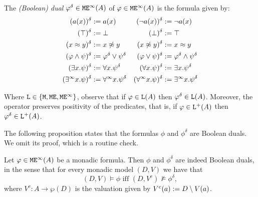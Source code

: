 \begin{definition}\label{def:concreteduals} 
The \emph{(Boolean) dual} $\varphi^{\delta} \in {\mathtt{M}\mathtt{E}^{\infty}}(A)$ of $\varphi\in 
{\mathtt{M}\mathtt{E}^{\infty}}(A)$ is the formula given by:
\begin{align*}
 (a(x))^{\delta} & \mathrel{:=}  a(x) 
 & (\lnot a(x))^{\delta} & \mathrel{:=}  \lnot a(x) 
\\ (\top)^{\delta} & \mathrel{:=}  \bot 
  & (\bot)^{\delta} & \mathrel{:=}  \top 
\\  (x \approx y)^{\delta} & \mathrel{:=}  x \not\approx y 
  & (x \not\approx y)^{\delta}& \mathrel{:=}  x \approx y 
\\ (\varphi \wedge \psi)^{\delta} &\mathrel{:=}  \varphi^{\delta} \vee \psi^{\delta} 
  &(\varphi \vee \psi)^{\delta}& \mathrel{:=}  \varphi^{\delta} \wedge \psi^{\delta}
\\ (\exists x.\psi)^{\delta} &\mathrel{:=}  \forall x.\psi^{\delta} 
  &(\forall x.\psi)^{\delta} &\mathrel{:=}  \exists x.\psi^{\delta} 
\\ (\exists^{\infty} x.\psi)^{\delta} &\mathrel{:=} \forall^{\infty} x.\psi^{\delta} 
  &(\forall^{\infty} x.\psi)^{\delta} &\mathrel{:=}  \exists^{\infty} x.\psi^{\delta}
\end{align*}
\end{definition}

\begin{remark}
Where $\mathtt{L}\in\{\mathtt{M},\mathtt{M}\mathtt{E},\mathtt{M}\mathtt{E}^{\infty}\}$, observe that if $\varphi \in \mathtt{L}(A)$ 
then $\varphi^{\delta} \in \mathtt{L}(A)$. 
Moreover, the operator preserves positivity of the predicates, that is, if $\varphi
\in \mathtt{L}^+(A)$ then $\varphi^{\delta} \in \mathtt{L}^+(A)$.
\end{remark}

\noindent 
The following proposition states that the formulas $\phi$ and $\phi^{\delta}$ 
are Boolean duals.
We omit its proof, which is a routine check.

\begin{proposition}\label{props:duals}
Let $\varphi \in \mathtt{M}\mathtt{E}^{\infty}(A)$ be a monadic formula.
Then $\phi$ and $\phi^{\delta}$ are indeed Boolean duals, in the sense that for
every monadic model $(D,V)$ we have that
\[
(D,V) \models \phi \text{ iff } (D,V^{c}) \not\models \phi^{\delta},
\]
where $V^{c}: A \to \wp (D)$ is the valuation given by $V^{c}(a) \mathrel{:=} 
D \setminus V(a)$.
\end{proposition}

